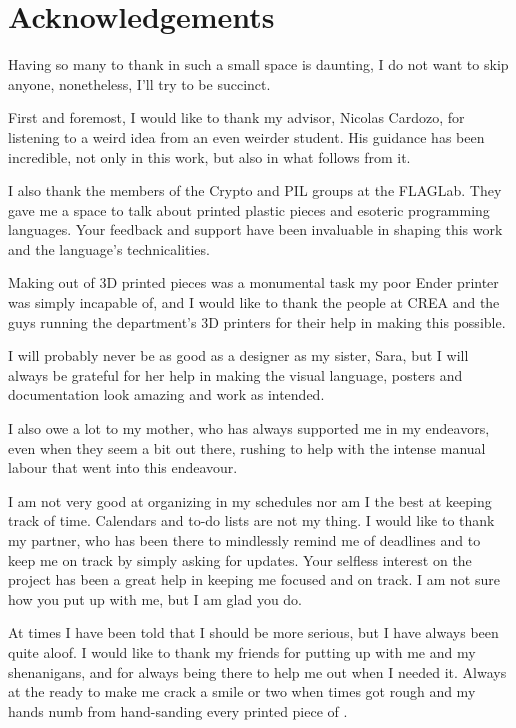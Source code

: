 
\chapter{Acknowledgements}

Having so many to thank in such a small space is daunting, I do not want to skip anyone, nonetheless, I'll try to be succinct.

First and foremost, I would like to thank my advisor, Nicolas Cardozo, for listening to a weird idea from an even weirder student.
His guidance has been incredible, not only in this work, but also in what follows from it.

I also thank the members of the Crypto and PIL groups at the FLAGLab. They gave me a space to talk about printed plastic pieces and
esoteric programming languages. Your feedback and support have been invaluable in shaping this work and the language's technicalities.

Making \sculpt out of 3D printed pieces was a monumental task my poor Ender printer was simply incapable of, and I would like to thank the people at CREA and the guys running the department's 3D printers for their help in making this possible.

I will probably never be as good as a designer as my sister, Sara, but I will always be grateful for
her help in making the \sculpt visual language, posters and documentation look amazing and work as intended.

I also owe a lot to my mother, who has always supported me in my endeavors, even when they seem a bit out there, rushing to help with the intense manual labour that went into this endeavour.

I am not very good at organizing in my schedules nor am I the best at keeping track of time. Calendars and to-do lists are not my thing.
I would like to thank my partner, who has been there to mindlessly remind me of deadlines and to keep me on track by simply asking for updates.
Your selfless interest on the project has been a great help in keeping me focused and on track.
I am not sure how you put up with me, but I am glad you do.

At times I have been told that I should be more serious, but I have always been quite aloof.
I would like to thank my friends for putting up with me and my shenanigans, and for always being there to help me out when I needed it.
Always at the ready to make me crack a smile or two when times got rough and my hands numb from hand-sanding every printed piece of \sculpt.

